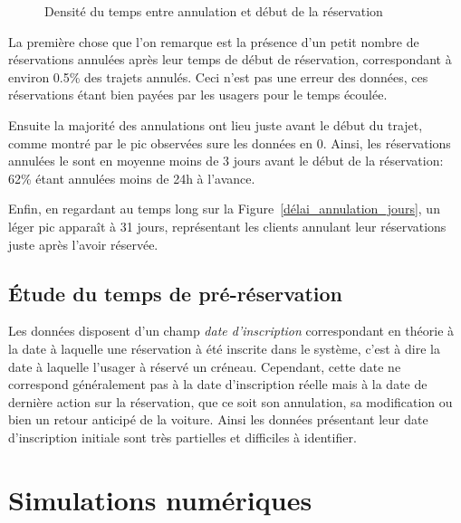 \documentclass[12pt,a4paper]{article}
\newcommand{\1}[1]{\mathbbm{1}_{\{#1\}} }
\theoremstyle{definition}
\begin{document}
{\begin{figure}[!h]
\centering
{}
\caption{Densité du temps entre annulation et début de la réservation}
\label{délai_annulation_début}
\end{figure}


La première chose que l'on remarque est la présence d'un petit nombre de réservations annulées après leur temps de début de réservation, correspondant à environ 0.5\% des trajets annulés. Ceci n'est pas une erreur des données, ces réservations étant bien payées par les usagers pour le temps écoulée.

Ensuite la majorité des annulations ont lieu juste avant le début du trajet, comme montré par le pic observées sure les données en 0. Ainsi, les réservations annulées le sont en moyenne moins de 3 jours avant le début de la réservation: 62\% étant annulées moins de 24h à l'avance.

Enfin, en regardant au temps long sur la Figure~\ref{délai_annulation_jours}, un léger pic apparaît à 31 jours, représentant les clients annulant leur réservations juste après l'avoir réservée.


	
\subsection{Étude du temps de pré-réservation}

Les données disposent d'un champ \emph{date d'inscription} correspondant en théorie à la date à laquelle une réservation à été inscrite dans le système, c'est à dire la date à laquelle l'usager à réservé un créneau. Cependant, cette date ne correspond généralement pas à la date d'inscription réelle mais à la date de dernière action sur la réservation, que ce soit son annulation, sa modification ou bien un retour anticipé de la voiture. Ainsi les données présentant leur  date d'inscription initiale sont très partielles et difficiles à identifier.

\section{Simulations numériques}

}
\end{document}
